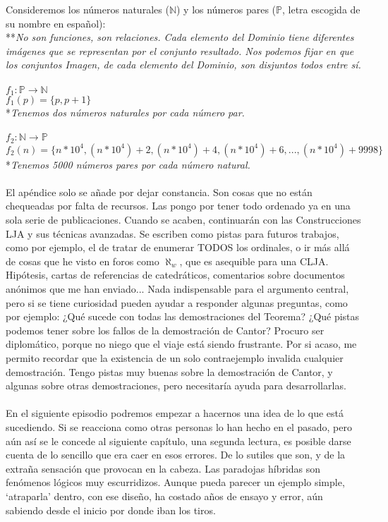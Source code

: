 	\noindent
	Consideremos los números naturales ($\mathbb{N}$) y los números pares ($\mathbb{P}$, letra escogida de su nombre en español):\\
	**\textit{No son funciones, son relaciones. Cada elemento del Dominio tiene diferentes imágenes que se representan por el conjunto resultado. Nos podemos fijar en que los conjuntos Imagen, de cada elemento del Dominio, son disjuntos todos entre sí.}\\\\
	$f_{1}: \mathbb{P} \longrightarrow \mathbb{N}$\\
	$f_{1}(p) = \{p, p+1\}$\\
	*\textit{Tenemos dos números naturales por cada número par.}\\\\
	$f_{2}: \mathbb{N} \longrightarrow \mathbb{P}$\\
	$f_{2}(n) = \{n*10^{4}, (n*10^{4})+2, (n*10^{4})+4,(n*10^{4})+6, ... , (n*10^{4})+9998 \}$\\
	*\textit{Tenemos 5000 números pares por cada número natural.}\\\\
	
	\noindent
	El apéndice solo se añade por dejar constancia. Son cosas que no están chequeadas por falta de recursos. Las pongo por tener todo ordenado ya en una sola serie de publicaciones. Cuando se acaben, continuarán con las Construcciones LJA y sus técnicas avanzadas. Se escriben como pistas para futuros trabajos, como por ejemplo, el de tratar de enumerar TODOS los ordinales, o ir más allá de cosas que he visto en foros como $\aleph_{w}$, que es asequible para una CLJA. Hipótesis, cartas de referencias de catedráticos, comentarios sobre documentos anónimos que me han enviado... Nada indispensable para el argumento central, pero si se tiene curiosidad pueden ayudar a responder algunas preguntas, como por ejemplo: ¿Qué sucede con todas las demostraciones del Teorema? ¿Qué pistas podemos tener sobre los fallos de la demostración de Cantor? Procuro ser diplomático, porque no niego que el viaje está siendo frustrante. Por si acaso, me permito recordar que la existencia de un solo contraejemplo invalida cualquier demostración. Tengo pistas muy buenas sobre la demostración de Cantor, y algunas sobre otras demostraciones, pero necesitaría ayuda para desarrollarlas.\\\\
	
	\noindent
	En el siguiente episodio podremos empezar a hacernos una idea de lo que está sucediendo. Si se reacciona como otras personas lo han hecho en el pasado, pero aún así se le concede al siguiente capítulo, una segunda lectura, es posible darse cuenta de lo sencillo que era caer en esos errores. De lo sutiles que son, y de la extraña sensación que provocan en la cabeza. Las paradojas híbridas son fenómenos lógicos muy escurridizos. Aunque pueda parecer un ejemplo simple, `atraparla' dentro, con ese diseño, ha costado años de ensayo y error, aún sabiendo desde el inicio por donde iban los tiros.\\\\
	
